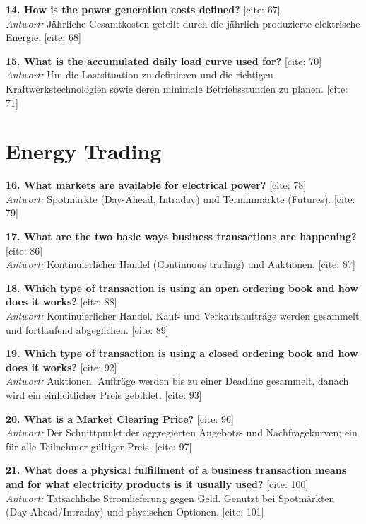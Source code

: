 \documentclass[11pt,a4paper]{article}
\begin{document}
\vspace{0.5cm}
\textbf{14. How is the power generation costs defined?} [cite: 67]\\
\textit{Antwort:} Jährliche Gesamtkosten geteilt durch die jährlich produzierte elektrische Energie. [cite: 68]

\vspace{0.5cm}
\textbf{15. What is the accumulated daily load curve used for?} [cite: 70]\\
\textit{Antwort:} Um die Lastsituation zu definieren und die richtigen Kraftwerkstechnologien sowie deren minimale Betriebsstunden zu planen. [cite: 71]

\section*{Energy Trading}

\textbf{16. What markets are available for electrical power?} [cite: 78]\\
\textit{Antwort:} Spotmärkte (Day-Ahead, Intraday) und Terminmärkte (Futures). [cite: 79]

\vspace{0.5cm}
\textbf{17. What are the two basic ways business transactions are happening?} [cite: 86]\\
\textit{Antwort:} Kontinuierlicher Handel (Continuous trading) und Auktionen. [cite: 87]

\vspace{0.5cm}
\textbf{18. Which type of transaction is using an open ordering book and how does it works?} [cite: 88]\\
\textit{Antwort:} Kontinuierlicher Handel. Kauf- und Verkaufsaufträge werden gesammelt und fortlaufend abgeglichen. [cite: 89]

\vspace{0.5cm}
\textbf{19. Which type of transaction is using a closed ordering book and how does it works?} [cite: 92]\\
\textit{Antwort:} Auktionen. Aufträge werden bis zu einer Deadline gesammelt, danach wird ein einheitlicher Preis gebildet. [cite: 93]

\vspace{0.5cm}
\textbf{20. What is a Market Clearing Price?} [cite: 96]\\
\textit{Antwort:} Der Schnittpunkt der aggregierten Angebots- und Nachfragekurven; ein für alle Teilnehmer gültiger Preis. [cite: 97]

\vspace{0.5cm}
\textbf{21. What does a physical fulfillment of a business transaction means and for what electricity products is it usually used?} [cite: 100]\\
\textit{Antwort:} Tatsächliche Stromlieferung gegen Geld. Genutzt bei Spotmärkten (Day-Ahead/Intraday) und physischen Optionen. [cite: 101]
\end{document}
